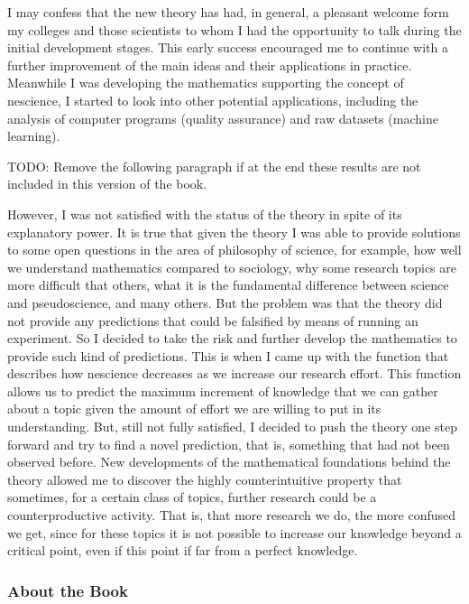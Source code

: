 I may confess that the new theory has had, in general, a pleasant welcome form my colleges and those scientists to whom I had the opportunity to talk during the initial development stages. This early success encouraged me to continue with a further improvement of the main ideas and their applications in practice. Meanwhile I was developing the mathematics supporting the concept of nescience, I started to look into other potential applications, including the analysis of computer programs (quality assurance) and raw datasets (machine learning).

{\color{red} TODO: Remove the following paragraph if at the end these results are not included in this version of the book.}

However, I was not satisfied with the status of the theory in spite of its explanatory power. It is true that given the theory I was able to provide solutions to some open questions in the area of philosophy of science, for example, how well we understand mathematics compared to sociology, why some research topics are more difficult that others, what it is the fundamental difference between science and pseudoscience, and many others. But the problem was that the theory did not provide any predictions that could be falsified by means of running an experiment. So I decided to take the risk and further develop the mathematics to provide such kind of predictions. This is when I came up with the function that describes how nescience decreases as we increase our research effort. This function allows us to predict the maximum increment of knowledge that we can gather about a topic given the amount of effort we are willing to put in its understanding. But, still not fully satisfied, I decided to push the theory one step forward and try to find a novel prediction, that is, something that had not been observed before. New developments of the mathematical foundations behind the theory allowed me to discover the highly counterintuitive property that sometimes, for a certain class of topics, further research could be a counterproductive activity. That is, that more research we do, the more confused we get, since for these topics it is not possible to increase our knowledge beyond a critical point, even if this point if far from a perfect knowledge.

%
%

\subsubsection*{About the Book}

